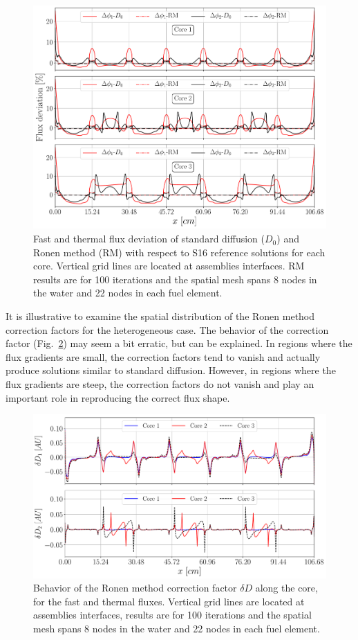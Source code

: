 \begin{figure}[htbp!]
	\centering
	\includegraphics[width=0.75\linewidth]{flx_err_diff_C123.pdf}
	\caption{Fast and thermal flux deviation of standard diffusion ($D_0$) and Ronen method (RM) with respect to S16 reference solutions for each core. Vertical grid lines are located at assemblies interfaces. RM results are for 100 iterations and the spatial mesh spans 8 nodes in the water and 22 nodes in each fuel element.}
	\label{fig:hetero-flux-dev}
\end{figure}

It is illustrative to examine the spatial distribution of the Ronen method correction factors for the heterogeneous case. The behavior of the correction factor (Fig.~\ref{fig:Dcoef}) may seem a bit erratic, but can be explained. In regions where the flux gradients are small, the correction factors tend to vanish and actually produce solutions similar to standard diffusion. However, in regions where the flux gradients are steep, the correction factors do not vanish and play an important role in reproducing the correct flux shape.

\begin{figure}[htbp!]
	\centering
	\includegraphics[width=0.75\linewidth]{RM_dD_100it_8_22_728_C123.pdf}
	\caption{Behavior of the Ronen method correction factor $\delta D$ along the core, for the fast and thermal fluxes. Vertical grid lines are located at assemblies interfaces, results are for 100 iterations and the spatial mesh spans 8 nodes in the water and 22 nodes in each fuel element.}
	\label{fig:Dcoef}
\end{figure}







